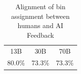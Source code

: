 \begin{table}[!t]
\caption{Alignment of bin assignment between humans and AI Feedback}
\label{table:few_shots_3}
\begin{center}
\begin{tabular}{ccc}
\toprule
13B & 30B & 70B\\
80.0\% & 73.3\% & 73.3\% \\
\bottomrule
\end{tabular}
\end{center}
\end{table}
